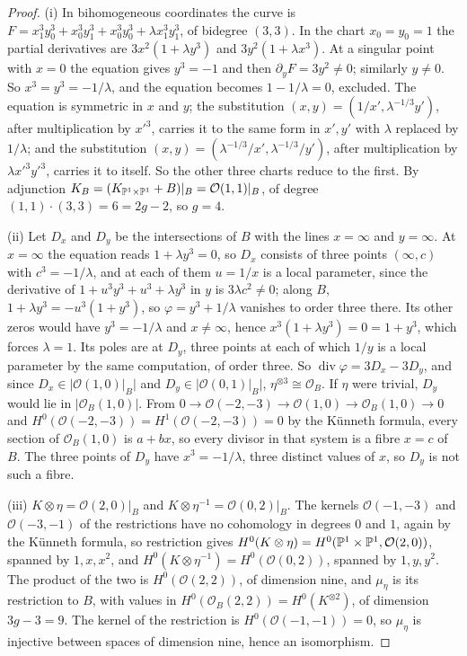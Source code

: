 \begin{proof}
(i) In bihomogeneous coordinates the curve is $F=x_{1}^{3}y_{0}^{3}+x_{0}^{3}y_{1}^{3}+x_{0}^{3}y_{0}^{3}+\lambda x_{1}^{3}y_{1}^{3}$, of bidegree $(3,3)$. In the chart $x_{0}=y_{0}=1$ the partial derivatives are $3x^{2}(1+\lambda y^{3})$ and $3y^{2}(1+\lambda x^{3})$. At a singular point with $x=0$ the equation gives $y^{3}=-1$ and then $\partial_{y}F=3y^{2}\ne0$; similarly $y\ne0$. So $x^{3}=y^{3}=-1/\lambda$, and the equation becomes $1-1/\lambda=0$, excluded. The equation is symmetric in $x$ and $y$; the substitution $(x,y)=(1/x',\lambda^{-1/3}y')$, after multiplication by $x'^{3}$, carries it to the same form in $x',y'$ with $\lambda$ replaced by $1/\lambda$; and the substitution $(x,y)=(\lambda^{-1/3}/x',\lambda^{-1/3}/y')$, after multiplication by $\lambda x'^{3}y'^{3}$, carries it to itself. So the other three charts reduce to the first. By adjunction $K_{B}=(K_{\mathbb{P}^{1}\times\mathbb{P}^{1}}+B)|_{B}=\mathcal{O}(1,1)|_{B}$, of degree $(1,1)\cdot(3,3)=6=2g-2$, so $g=4$.

(ii) Let $D_{x}$ and $D_{y}$ be the intersections of $B$ with the lines $x=\infty$ and $y=\infty$. At $x=\infty$ the equation reads $1+\lambda y^{3}=0$, so $D_{x}$ consists of three points $(\infty,c)$ with $c^{3}=-1/\lambda$, and at each of them $u=1/x$ is a local parameter, since the derivative of $1+u^{3}y^{3}+u^{3}+\lambda y^{3}$ in $y$ is $3\lambda c^{2}\ne0$; along $B$, $1+\lambda y^{3}=-u^{3}(1+y^{3})$, so $\varphi=y^{3}+1/\lambda$ vanishes to order three there. Its other zeros would have $y^{3}=-1/\lambda$ and $x\ne\infty$, hence $x^{3}(1+\lambda y^{3})=0=1+y^{3}$, which forces $\lambda=1$. Its poles are at $D_{y}$, three points at each of which $1/y$ is a local parameter by the same computation, of order three. So $\operatorname{div}\varphi=3D_{x}-3D_{y}$, and since $D_{x}\in|\mathcal{O}(1,0)|_{B}|$ and $D_{y}\in|\mathcal{O}(0,1)|_{B}|$, $\eta^{\otimes3}\cong\mathcal{O}_{B}$. If $\eta$ were trivial, $D_{y}$ would lie in $|\mathcal{O}_{B}(1,0)|$. From $0\to\mathcal{O}(-2,-3)\to\mathcal{O}(1,0)\to\mathcal{O}_{B}(1,0)\to0$ and $H^{0}(\mathcal{O}(-2,-3))=H^{1}(\mathcal{O}(-2,-3))=0$ by the K\"unneth formula, every section of $\mathcal{O}_{B}(1,0)$ is $a+bx$, so every divisor in that system is a fibre $x=c$ of $B$. The three points of $D_{y}$ have $x^{3}=-1/\lambda$, three distinct values of $x$, so $D_{y}$ is not such a fibre.

(iii) $K\otimes\eta=\mathcal{O}(2,0)|_{B}$ and $K\otimes\eta^{-1}=\mathcal{O}(0,2)|_{B}$. The kernels $\mathcal{O}(-1,-3)$ and $\mathcal{O}(-3,-1)$ of the restrictions have no cohomology in degrees $0$ and $1$, again by the K\"unneth formula, so restriction gives $H^{0}(K\otimes\eta)=H^{0}(\mathbb{P}^{1}\times\mathbb{P}^{1},\mathcal{O}(2,0))$, spanned by $1,x,x^{2}$, and $H^{0}(K\otimes\eta^{-1})=H^{0}(\mathcal{O}(0,2))$, spanned by $1,y,y^{2}$. The product of the two is $H^{0}(\mathcal{O}(2,2))$, of dimension nine, and $\mu_{\eta}$ is its restriction to $B$, with values in $H^{0}(\mathcal{O}_{B}(2,2))=H^{0}(K^{\otimes2})$, of dimension $3g-3=9$. The kernel of the restriction is $H^{0}(\mathcal{O}(-1,-1))=0$, so $\mu_{\eta}$ is injective between spaces of dimension nine, hence an isomorphism.


\end{proof}
